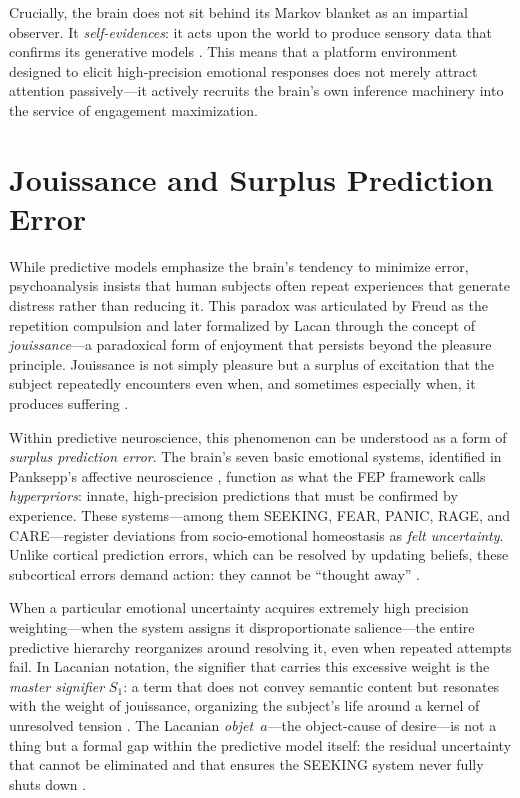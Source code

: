 \documentclass[12pt,a4paper]{article}
\begin{document}
Crucially, the brain does not sit behind its Markov blanket as an impartial observer. It
\emph{self-evidences}: it acts upon the world to produce sensory data that confirms its
generative models \citep{friston2013}. This means that a platform environment designed to
elicit high-precision emotional responses does not merely attract attention passively---it
actively recruits the brain's own inference machinery into the service of engagement
maximization.

\section{Jouissance and Surplus Prediction Error}

While predictive models emphasize the brain's tendency to minimize error, psychoanalysis insists
that human subjects often repeat experiences that generate distress rather than reducing it.
This paradox was articulated by Freud as the repetition compulsion \citep{freud1920} and later
formalized by Lacan through the concept of \emph{jouissance}---a paradoxical form of enjoyment
that persists beyond the pleasure principle. Jouissance is not simply pleasure but a surplus of
excitation that the subject repeatedly encounters even when, and sometimes especially when, it
produces suffering \citep{lacan2006,dallaglio2024}.

Within predictive neuroscience, this phenomenon can be understood as a form of \emph{surplus
prediction error}. The brain's seven basic emotional systems, identified in Panksepp's affective
neuroscience \citep{panksepp1998}, function as what the FEP framework calls \emph{hyperpriors}:
innate, high-precision predictions that must be confirmed by experience. These systems---among
them SEEKING, FEAR, PANIC, RAGE, and CARE---register deviations from socio-emotional homeostasis
as \emph{felt uncertainty}. Unlike cortical prediction errors, which can be resolved by updating
beliefs, these subcortical errors demand action: they cannot be ``thought away''
\citep{panksepp1998,solms2021}.

When a particular emotional uncertainty acquires extremely high precision weighting---when the
system assigns it disproportionate salience---the entire predictive hierarchy reorganizes around
resolving it, even when repeated attempts fail. In Lacanian notation, the signifier that carries
this excessive weight is the \emph{master signifier} $S_1$: a term that does not convey semantic
content but resonates with the weight of jouissance, organizing the subject's life around a
kernel of unresolved tension \citep{lacan2006}. The Lacanian \emph{objet~$a$}---the object-cause
of desire---is not a thing but a formal gap within the predictive model itself: the residual
uncertainty that cannot be eliminated and that ensures the SEEKING system never fully shuts down
\citep{dallaglio2024,panksepp1998}.
\end{document}
